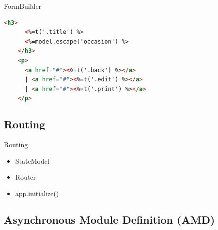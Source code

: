 \begin{frame}[fragile]{FormBuilder}
  \begin{lstlisting}[language=HTML,gobble=4]
    <h3>
      <%=t('.title') %>
      <%=model.escape('occasion') %>
    </h3>
    <p>
      <a href="#"><%=t('.back') %></a>
      | <a href="#"><%=t('.edit') %></a>
      | <a href="#"><%=t('.print') %></a>
    </p>
  \end{lstlisting}
\end{frame}

\subsection{Routing}

\begin{frame}{Routing}
  \begin{itemize}
    \item StateModel
    \item Router
    \item app.initialize()
  \end{itemize}
\end{frame}

\subsection[AMD]{Asynchronous Module Definition (AMD)}



